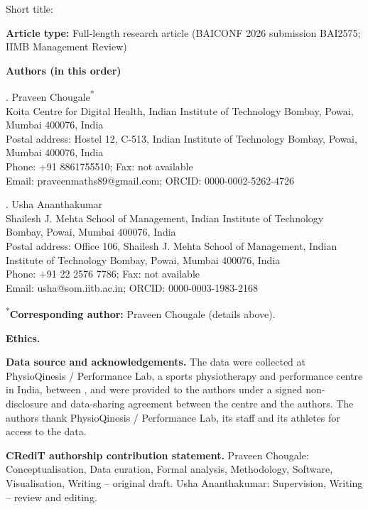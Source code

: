 \documentclass[12pt,a4paper]{article}
\begin{document}
\onehalfspacing
\begin{center}
{\Large\bfseries \papertitle\par}
\medskip
Short title: \shorttitle
\end{center}
\bigskip
\noindent\textbf{Article type:} Full-length research article (BAICONF 2026 submission BAI2575; IIMB Management Review)

\medskip
\noindent\textbf{Authors (in this order)}\par\smallskip
{}. Praveen Chougale\textsuperscript{*}\\
Koita Centre for Digital Health, Indian Institute of Technology Bombay, Powai, Mumbai 400076, India\\
Postal address: Hostel 12, C-513, Indian Institute of Technology Bombay, Powai, Mumbai 400076, India\\
Phone: +91 8861755510; Fax: not available\\
Email: praveenmaths89@gmail.com; ORCID: 0000-0002-5262-4726

\smallskip
{}. Usha Ananthakumar\\
Shailesh J. Mehta School of Management, Indian Institute of Technology Bombay, Powai, Mumbai 400076, India\\
Postal address: Office 106, Shailesh J. Mehta School of Management, Indian Institute of Technology Bombay, Powai, Mumbai 400076, India\\
Phone: +91 22 2576 7786; Fax: not available\\
Email: usha@som.iitb.ac.in; ORCID: 0000-0003-1983-2168

\medskip
\noindent\textsuperscript{*}\textbf{Corresponding author:} Praveen Chougale (details above).

\medskip
\noindent\textbf{Ethics.} 

\medskip
\noindent\textbf{Data source and acknowledgements.} The data were collected at PhysioQinesis / Performance Lab, a sports physiotherapy and performance centre in India, between \testPeriod, and were provided to the authors under a signed non-disclosure and data-sharing agreement between the centre and the authors. The authors thank PhysioQinesis / Performance Lab, its staff and its athletes for access to the data.

\medskip
\noindent\textbf{CRediT authorship contribution statement.} Praveen Chougale: Conceptualisation, Data curation, Formal analysis, Methodology, Software, Visualisation, Writing -- original draft. Usha Ananthakumar: Supervision, Writing -- review and editing.
\end{document}
